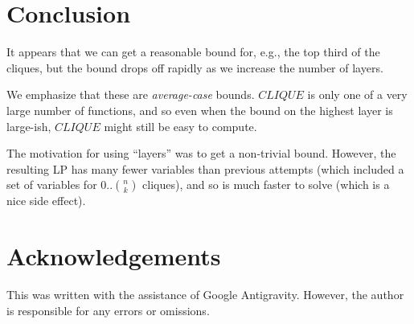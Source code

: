 \documentclass[12pt]{article}
\theoremstyle{definition}
\begin{document}
\section{Conclusion}

It appears that we can get a reasonable bound for, e.g., the top third of the
cliques, but the bound drops off rapidly as we increase the number of
layers.

We emphasize that these are {\em average-case} bounds. $CLIQUE$ is only
one of a very large number of functions, and so even when the bound
on the highest layer is large-ish, $CLIQUE$ might still be easy to compute.

The motivation for using ``layers'' was to get a non-trivial bound.
However, the resulting LP has many fewer variables than previous attempts
(which included a set of variables for $0..\binom{n}{k}$ cliques), and
so is much faster to solve (which is a nice side effect).

\section{Acknowledgements}

This was written with the assistance of Google Antigravity.
However, the author is responsible for any errors or omissions.



\end{document}
